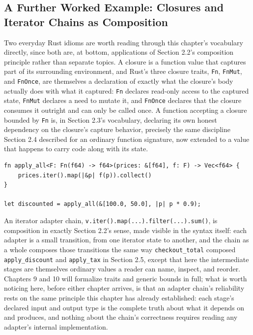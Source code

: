 \documentclass[11pt]{book}
\begin{document}
\subsection*{A Further Worked Example: Closures and Iterator Chains as Composition}

Two everyday Rust idioms are worth reading through this chapter's vocabulary directly, since both are, at bottom, applications of Section 2.2's composition principle rather than separate topics. A closure is a function value that captures part of its surrounding environment, and Rust's three closure traits, \texttt{Fn}, \texttt{FnMut}, and \texttt{FnOnce}, are themselves a declaration of exactly what the closure's body actually does with what it captured: \texttt{Fn} declares read-only access to the captured state, \texttt{FnMut} declares a need to mutate it, and \texttt{FnOnce} declares that the closure consumes it outright and can only be called once. A function accepting a closure bounded by \texttt{Fn} is, in Section 2.3's vocabulary, declaring its own honest dependency on the closure's capture behavior, precisely the same discipline Section 2.4 described for an ordinary function signature, now extended to a value that happens to carry code along with its state.

\begin{lstlisting}
fn apply_all<F: Fn(f64) -> f64>(prices: &[f64], f: F) -> Vec<f64> {
    prices.iter().map(|&p| f(p)).collect()
}

let discounted = apply_all(&[100.0, 50.0], |p| p * 0.9);
\end{lstlisting}

An iterator adapter chain, \texttt{v.iter().map(...).filter(...).sum()}, is composition in exactly Section 2.2's sense, made visible in the syntax itself: each adapter is a small transition, from one iterator state to another, and the chain as a whole composes those transitions the same way \texttt{checkout\_total} composed \texttt{apply\_discount} and \texttt{apply\_tax} in Section 2.5, except that here the intermediate stages are themselves ordinary values a reader can name, inspect, and reorder. Chapters 9 and 10 will formalize traits and generic bounds in full; what is worth noticing here, before either chapter arrives, is that an adapter chain's reliability rests on the same principle this chapter has already established: each stage's declared input and output type is the complete truth about what it depends on and produces, and nothing about the chain's correctness requires reading any adapter's internal implementation.
\end{document}
